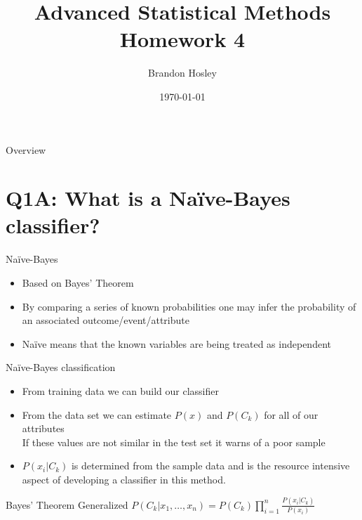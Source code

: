 \documentclass{beamer}
\title{Advanced Statistical Methods \\ Homework 4}
\author{Brandon Hosley}
\institute{University of Illinois - Springfield}
\date{\today}
\begin{document}
\frame{\titlepage}

\begin{frame}{Overview}
\tableofcontents
\end{frame}

\section[Q1A]{Q1A: What is a Na\"{i}ve-Bayes classifier?}

\begin{frame}{Na\"{i}ve-Bayes}
	\begin{itemize}[<+->]
		\item Based on Bayes' Theorem
		\item By comparing a series of known probabilities one may infer the probability of an associated outcome/event/attribute
		\item Na\"{i}ve means that the known variables are being treated as independent
	\end{itemize}
	
\end{frame}
\begin{frame}{Na\"{i}ve-Bayes classification}
	\begin{itemize}[<+->]
		\item From training data we can build our classifier
		\item From the data set we can estimate $P(x)$ and $P(C_k)$
			for all of our attributes \\
			If these values are not similar in the test set it warns of a poor sample
		\item $P(x_i|C_k)$ is determined from the sample data and is the resource intensive aspect of developing a classifier in this method.
	\end{itemize}
	\begin{exampleblock}{Bayes' Theorem Generalized} 
		$P(C_k|x_1,\ldots,x_n)=P(C_k)\prod_{i=1}^{n} \frac{P(x_i|C_k)}{P(x_i)}$ 
	\end{exampleblock}
\end{frame}
\end{document}
